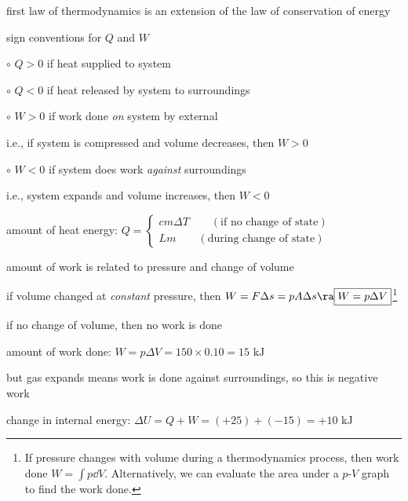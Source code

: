 \cmt first law of thermodynamics is an extension of the law of conservation of energy

\cmt sign conventions for $Q$ and $W$

\begin{compactitem}
	\item[$\circ$] $Q>0$ if heat supplied to system
	
	\item[$\circ$] $Q<0$ if heat released by system to surroundings
	
	\item[$\circ$] $W>0$ if work done \emph{on} system by external
	
	i.e., if system is compressed and volume decreases, then $W>0$
	
	\item[$\circ$] $W<0$ if system does work \emph{against} surroundings
	
	i.e., system expands and volume increases, then $W<0$
	
\end{compactitem}

\cmt amount of heat energy: $Q=\left\{ \begin{array}{l}
	cm\Delta T \qquad (\text{if no change of state}) \\
	Lm \qquad (\text{during change of state})
	\end{array}\right.$

\cmt amount of work is related to pressure and change of volume

if volume changed at \emph{constant} pressure, then $W=F\Delta s = pA\Delta s \ra \boxed{W = p\Delta V}$\footnote{If pressure changes with volume during a thermodynamics process, then work done $W=\int p \dd V$. Alternatively, we can evaluate the area under a $p$-$V$ graph to find the work done.}

if no change of volume, then no work is done
	


\sol amount of work done: $W = p \Delta V = 150 \times 0.10 = 15 \text{ kJ}$

but gas expands means work is done against surroundings, so this is negative work

change in internal energy: $\Delta U = Q +  W = (+25) + (-15) = +10 \text{ kJ}$ \eoe

